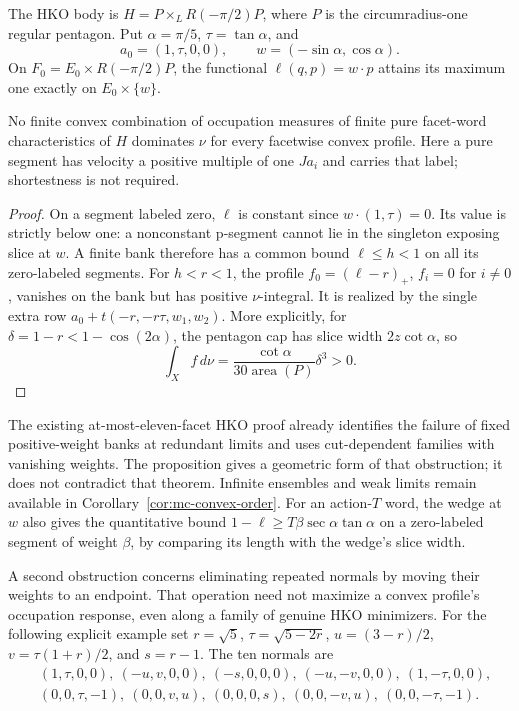 The HKO body is $H=P\times_LR(-\pi/2)P$, where $P$ is the circumradius-one
regular pentagon. Put $\alpha=\pi/5$, $\tau=\tan\alpha$, and
\[
 a_0=(1,\tau,0,0),\qquad w=(-\sin\alpha,\cos\alpha).
\]
On $F_0=E_0\times R(-\pi/2)P$, the functional $\ell(q,p)=w\cdot p$
attains its maximum one exactly on $E_0\times\{w\}$.

\begin{proposition}
No finite convex combination of occupation measures of finite pure
facet-word characteristics of $H$ dominates $\nu$ for every facetwise convex
profile. Here a pure segment has velocity a positive multiple of one
$Ja_i$ and carries that label; shortestness is not required.
\end{proposition}
\begin{proof}
On a segment labeled zero, $\ell$ is constant since
$w\cdot(1,\tau)=0$. Its value is strictly below one: a nonconstant
p-segment cannot lie in the singleton exposing slice at $w$.
A finite bank therefore has a common bound $\ell\leq h<1$ on all its
zero-labeled segments. For $h<r<1$, the profile
$f_0=(\ell-r)_+$, $f_i=0$ for $i\ne0$, vanishes on the bank but has
positive $\nu$-integral. It is realized by the single extra row
$a_0+t(-r,-r\tau,w_1,w_2)$.
More explicitly, for $\delta=1-r<1-\cos(2\alpha)$, the pentagon cap
has slice width $2z\cot\alpha$, so
\[
 \int_Xf\,d\nu=\frac{\cot\alpha}{30\operatorname{area}(P)}\delta^3>0.
\]
\end{proof}

The existing at-most-eleven-facet HKO proof already identifies the failure
of fixed positive-weight banks at redundant limits and uses cut-dependent
families with vanishing weights. The proposition gives a geometric form of
that obstruction; it does not contradict that theorem. Infinite ensembles
and weak limits remain available in Corollary~\ref{cor:mc-convex-order}.
For an action-$T$ word, the wedge at $w$ also gives the quantitative bound
$1-\ell\geq T\beta\sec\alpha\tan\alpha$ on a zero-labeled segment of
weight $\beta$, by comparing its length with the wedge's slice width.

A second obstruction concerns eliminating repeated normals by moving their
weights to an endpoint. That operation need not maximize a convex profile's
occupation response, even along a family of genuine HKO minimizers.
For the following explicit example set $r=\sqrt5$, $\tau=\sqrt{5-2r}$,
$u=(3-r)/2$, $v=\tau(1+r)/2$, and $s=r-1$. The ten normals are
\[
\begin{split}
 &(1,\tau,0,0),\ (-u,v,0,0),\ (-s,0,0,0),\ (-u,-v,0,0),\ (1,-\tau,0,0),\\
 &(0,0,\tau,-1),\ (0,0,v,u),\ (0,0,0,s),\ (0,0,-v,u),\ (0,0,-\tau,-1).
\end{split}
\]


